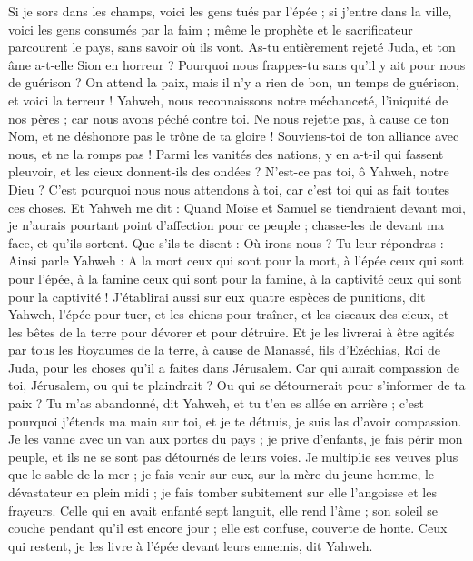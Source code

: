 \begin{multicols}{2}
Si je sors dans les champs, voici les gens tués par l'épée ; si j'entre dans la ville, voici les gens consumés par la faim ; même le prophète et le sacrificateur parcourent le pays, sans savoir où ils vont.
As-tu entièrement rejeté Juda, et ton âme a-t-elle Sion en horreur ? Pourquoi nous frappes-tu sans qu'il y ait pour nous de guérison ? On attend la paix, mais il n'y a rien de bon, un temps de guérison, et voici la terreur !
Yahweh, nous reconnaissons notre méchanceté, l'iniquité de nos pères ; car nous avons péché contre toi.
Ne nous rejette pas, à cause de ton Nom, et ne déshonore pas le trône de ta gloire ! Souviens-toi de ton alliance avec nous, et ne la romps pas !
Parmi les vanités des nations, y en a-t-il qui fassent pleuvoir, et les cieux donnent-ils des ondées ? N'est-ce pas toi, ô Yahweh, notre Dieu ? C'est pourquoi nous nous attendons à toi, car c'est toi qui as fait toutes ces choses.
\VerseOne{}Et Yahweh me dit : Quand Moïse et Samuel se tiendraient devant moi, je n'aurais pourtant point d'affection pour ce peuple ; chasse-les de devant ma face, et qu'ils sortent.
Que s'ils te disent : Où irons-nous ? Tu leur répondras : Ainsi parle Yahweh : A la mort ceux qui sont pour la mort, à l'épée ceux qui sont pour l'épée, à la famine ceux qui sont pour la famine, à la captivité ceux qui sont pour la captivité !
J'établirai aussi sur eux quatre espèces de punitions, dit Yahweh, l'épée pour tuer, et les chiens pour traîner, et les oiseaux des cieux, et les bêtes de la terre pour dévorer et pour détruire. 
Et je les livrerai à être agités par tous les Royaumes de la terre, à cause de Manassé, fils d'Ezéchias, Roi de Juda, pour les choses qu'il a faites dans Jérusalem. 
Car qui aurait compassion de toi, Jérusalem, ou qui te plaindrait ? Ou qui se détournerait pour s'informer de ta paix ? 
Tu m'as abandonné, dit Yahweh, et tu t'en es allée en arrière ; c'est pourquoi j'étends ma main sur toi, et je te détruis, je suis las d'avoir compassion.
Je les vanne avec un van aux portes du pays ; je prive d'enfants, je fais périr mon peuple, et ils ne se sont pas détournés de leurs voies.
Je multiplie ses veuves plus que le sable de la mer ; je fais venir sur eux, sur la mère du jeune homme, le dévastateur en plein midi ; je fais tomber subitement sur elle l'angoisse et les frayeurs.
Celle qui en avait enfanté sept languit, elle rend l'âme ; son soleil se couche pendant qu'il est encore jour ; elle est confuse, couverte de honte. Ceux qui restent, je les livre à l'épée devant leurs ennemis, dit Yahweh.

\end{multicols}
